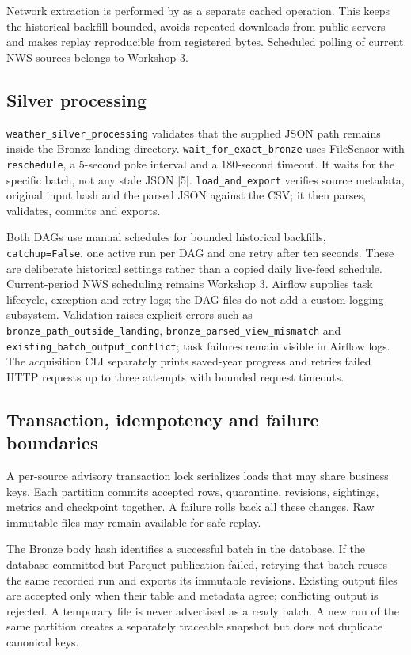 \documentclass[10pt]{article}
\begin{document}
Network extraction is performed by 
as a separate cached operation. This keeps the historical backfill bounded,
avoids repeated downloads from public servers and makes replay reproducible from
registered bytes. Scheduled polling of current NWS sources belongs to Workshop 3.

\subsection{Silver processing}
\texttt{weather\_silver\_processing} validates that the supplied JSON path remains
inside the Bronze landing directory. \texttt{wait\_for\_exact\_bronze} uses
FileSensor with \texttt{reschedule}, a 5-second poke interval and a 180-second
timeout. It waits for the specific batch, not any stale JSON [5].
\texttt{load\_and\_export} verifies source metadata, original input hash and the
parsed JSON against the CSV; it then parses, validates, commits and exports.

Both DAGs use manual schedules for bounded historical backfills,
\texttt{catchup=False}, one active run per DAG and one retry after ten seconds.
These are deliberate historical settings rather than a copied daily live-feed
schedule. Current-period NWS scheduling remains Workshop 3.
Airflow supplies task lifecycle, exception and retry logs; the DAG files do not
add a custom logging subsystem. Validation raises explicit errors such as
\texttt{bronze\_path\_outside\_landing},
\texttt{bronze\_parsed\_view\_mismatch} and
\texttt{existing\_batch\_output\_conflict}; task failures remain visible in
Airflow logs. The acquisition CLI separately prints saved-year progress and
retries failed HTTP requests up to three attempts with bounded request timeouts.

\subsection{Transaction, idempotency and failure boundaries}
A per-source advisory transaction lock serializes loads that may share business
keys. Each partition commits accepted rows, quarantine, revisions, sightings,
metrics and checkpoint together. A failure rolls back all these changes.
Raw immutable files may remain available for safe replay.

The Bronze body hash identifies a successful batch in the database. If the
database committed but Parquet publication failed, retrying that batch reuses
the same recorded run and exports its immutable revisions. Existing output
files are accepted only when their table and metadata agree; conflicting output
is rejected. A temporary file is never advertised as a ready batch.
A new run of the same partition creates a separately traceable snapshot but
does not duplicate canonical keys.
\end{document}

